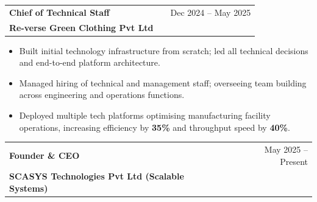 \documentclass[a4paper,10pt]{article}
\begin{document}
\begin{tabularx}{\linewidth}{ @{}l X r@{} }

\textbf{Chief of Technical Staff} & \hfill & \textcolor[HTML]{371e77}{Dec 2024 -- May 2025} \\

\textcolor[HTML]{371e77}{\textbf{Re-verse Green Clothing Pvt Ltd}} & & \\

\end{tabularx}

\vspace{-8pt}

\begin{itemize}[nosep, leftmargin=1.5em, itemsep=0pt, topsep=0pt]

\item Built initial technology infrastructure from scratch; led all technical decisions and end-to-end platform architecture.

\item Managed hiring of technical and management staff; overseeing team building across engineering and operations functions.

\item Deployed multiple tech platforms optimising manufacturing facility operations, increasing efficiency by \textbf{35\%} and throughput speed by \textbf{40\%}.

\end{itemize}



\begin{tabularx}{\linewidth}{ @{}l X r@{} }

\textbf{Founder \& CEO} & \hfill & \textcolor[HTML]{371e77}{May 2025 -- Present} \\

\textcolor[HTML]{371e77}{\textbf{SCASYS Technologies Pvt Ltd (Scalable Systems)}} & & \\

\end{tabularx}

\vspace{-8pt}
\end{document}
